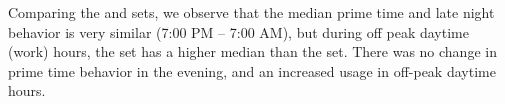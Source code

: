 Comparing the \test and \control sets, we observe that the median prime time and late night
behavior is very similar (7:00 PM -- 7:00 AM), but during off peak daytime (work) hours,
the \test set has a higher median than the \control set. There was no change in
prime time behavior in the evening, and an increased usage in off-peak daytime hours.


